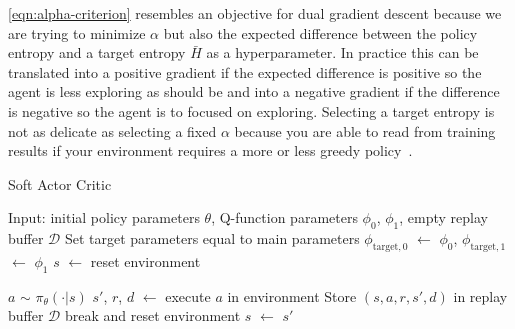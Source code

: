 \eqref{eqn:alpha-criterion} resembles an objective for dual gradient descent because we are trying to minimize $\alpha$ but also the expected difference between the policy entropy and a target entropy $\bar{H}$ as a hyperparameter. In practice this can be translated into a positive gradient if the expected difference is positive so the agent is less exploring as should be and into a negative gradient if the difference is negative so the agent is to focused on exploring. Selecting a target entropy is not as delicate as selecting a fixed $\alpha$ because you are able to read from training results if your environment requires a more or less greedy policy~\cite{SpinningUp2018}.

\begin{algorithm}
	\caption{Soft Actor Critic}\label{alg:SAC}
	\begin{algorithmic}
		\State{} Input: initial policy parameters $\theta$, Q-function parameters $\phi_0$, $\phi_1$, empty replay buffer $\mathcal{D}$
			\State{} Set target parameters equal to main parameters $\phi_{\text{target}, 0}$ $\leftarrow$ $\phi_0$, $\phi_{\text{target}, 1}$ $\leftarrow$ $\phi_1$ 
			\State{} $s$ $\leftarrow$ reset environment
			
			\State{} $a$ $\sim$ $\pi_\theta(\cdot | s)$
			\State{} $s'$, $r$, $d$ $\leftarrow$ execute $a$ in environment
			\State{} Store $(s, a, r, s', d)$ in replay buffer $\mathcal{D}$
			\State{} break and reset environment
			\EndIf{}
			\State{} $s$ $\leftarrow$ $s'$
			\EndFor{}
			

\end{algorithmic}
\end{algorithm}
